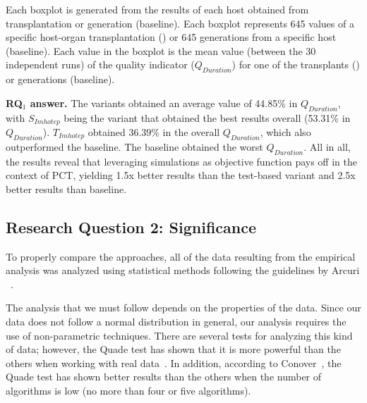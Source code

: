 Each boxplot is generated from the results of each host obtained from transplantation \ApproachName{} or generation (baseline). Each boxplot represents 645 values of a specific host-organ transplantation (\ApproachName{}) or 645 generations from a specific host (baseline). Each value in the boxplot is the mean value (between the 30 independent runs) of the quality indicator ($Q_{Duration}$) for one of the transplants (\ApproachName{}) or generations (baseline).


\textbf{RQ$_1$ answer. }
The variants obtained an average value of 44.85\% in $Q_{Duration}$, with $S_{Imhotep}$ being the variant that obtained the best results overall (53.31\% in $Q_{Duration}$). $T_{Imhotep}$ obtained 36.39\% in the overall $Q_{Duration}$, which also outperformed the baseline. The baseline obtained the worst $Q_{Duration}$. All in all, the results reveal that leveraging simulations as objective function pays off in the context of PCT, yielding 1.5x better results than the test-based variant and 2.5x better results than baseline.

\subsection{Research Question 2: Significance}

To properly compare the approaches, all of the data resulting from the empirical analysis was analyzed using statistical methods following the guidelines by Arcuri \etal~\cite{Arcuri2014}.

The analysis that we must follow depends on the properties of the data. Since our data does not follow a normal distribution in general, our analysis requires the use of non-parametric techniques. There are several tests for analyzing this kind of data; however, the Quade test has shown that it is more powerful than the others when working with real data~\cite{Garcia2010}. In addition, according to Conover~\cite{Conover1999}, the Quade test has shown better results than the others when the number of algorithms is low (no more than four or five algorithms).

